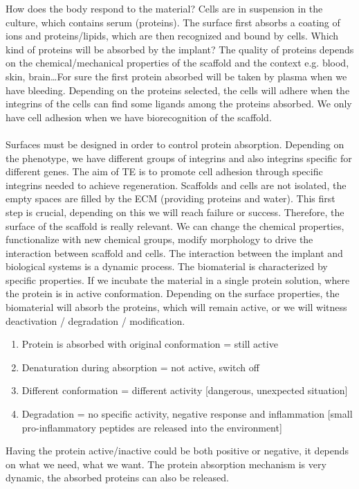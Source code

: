 \noindent
How does the body respond to the material?
Cells are in suspension in the culture, which contains serum (proteins). The surface first absorbs a coating of ions and proteins/lipids, which are then recognized and bound by cells.
Which kind of proteins will be absorbed by the implant? The quality of proteins depends on the chemical/mechanical properties of the scaffold and the context e.g. blood, skin, brain…For sure the first protein absorbed will be taken by plasma when we have bleeding. Depending on the proteins selected, the cells will adhere when the integrins of the cells can find some ligands among the proteins absorbed.
We only have cell adhesion when we have biorecognition of the scaffold.
\\
\\
\noindent
Surfaces must be designed in order to control protein absorption. Depending on the phenotype, we have different groups of integrins and also integrins specific for different genes.
The aim of TE is to promote cell adhesion through specific integrins needed to achieve regeneration. Scaffolds and cells are not isolated,  the empty spaces are filled by the ECM (providing proteins and water). This first step is crucial, depending on this we will reach failure or success. Therefore, the surface of the scaffold is really relevant. We can change the chemical properties, functionalize with new chemical groups, modify morphology to drive the interaction between scaffold and cells.
The interaction between the implant and biological systems is a dynamic process. The biomaterial is characterized by specific properties. If we incubate the material in a single protein solution, where the protein is in active conformation. Depending on the surface properties, the biomaterial will absorb the proteins, which will remain active, or we will witness deactivation / degradation / modification.
\begin{enumerate}
\item Protein is absorbed with original conformation = still active
\item Denaturation during absorption = not active, switch off
\item Different conformation = different activity [dangerous, unexpected situation]
\item Degradation = no specific activity, negative response and inflammation [small pro-inflammatory peptides are released into the environment]
\end{enumerate}
Having the protein active/inactive could be both positive or negative, it depends on what we need, what we want. The protein absorption mechanism is very dynamic, the absorbed proteins can also be released.
